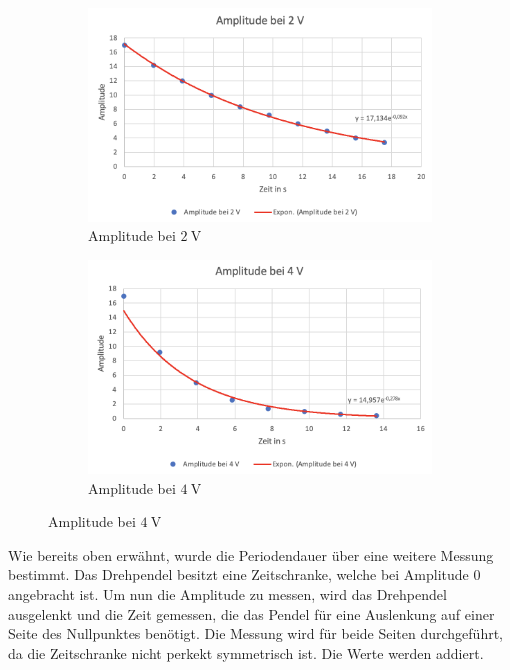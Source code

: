             \begin{figure}[H]
                \begin{subfigure}{0.48\textwidth}
                    \centering
                    \includegraphics[width=\textwidth]{bilder/plot_v1_2V.png}
                    \caption{Amplitude bei $2\ \mathrm{V}$}
                    \label{fig:plot_v1_2V}
                \end{subfigure}
                \begin{subfigure}{0.48\textwidth}
                    \centering
                    \includegraphics[width=\textwidth]{bilder/plot_v1_4V.png}
                    \caption{Amplitude bei $4\ \mathrm{V}$}
                    \label{fig:plot_v1_4V}
                \end{subfigure}
            \end{figure}

            Wie bereits oben erwähnt, wurde die Periodendauer über eine weitere Messung bestimmt. Das Drehpendel besitzt eine Zeitschranke, welche bei Amplitude $0$ angebracht ist. Um nun die Amplitude zu messen, wird das Drehpendel ausgelenkt und die Zeit gemessen, die das Pendel für eine Auslenkung auf einer Seite des Nullpunktes benötigt. Die Messung wird für beide Seiten durchgeführt, da die Zeitschranke nicht perkekt symmetrisch ist. Die Werte werden addiert.

